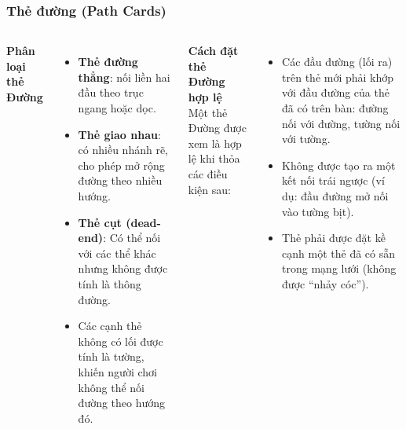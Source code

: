 \begin{frame}
\frametitle{Thẻ đường (Path Cards)}

\begin{columns}
    \textbf{Phân loại thẻ Đường}  \\
    \begin{itemize}
        \item \textbf{Thẻ đường thẳng}: nối liền hai đầu theo trục ngang hoặc dọc.
        \item \textbf{Thẻ giao nhau}: có nhiều nhánh rẽ, cho phép mở rộng đường theo nhiều hướng.
        \item \textbf{Thẻ cụt (dead-end)}: Có thể nối với các thể khác nhưng không được tính là thông đường.
        \item Các cạnh thẻ không có lối được tính là tường,  khiến người chơi không thể nối đường theo hướng đó.
    \end{itemize}
    

    \textbf{Cách đặt thẻ Đường hợp lệ}  \\
    Một thẻ Đường được xem là hợp lệ khi thỏa các điều kiện sau:
    \begin{itemize}
        \item Các đầu đường (lối ra) trên thẻ mới phải khớp với đầu đường của thẻ đã có trên bàn: đường nối với đường, tường nối với tường.
        \item Không được tạo ra một kết nối trái ngược (ví dụ: đầu đường mở nối vào tường bịt).
        \item Thẻ phải được đặt kề cạnh một thẻ đã có sẵn trong mạng lưới (không được “nhảy cóc”).
    \end{itemize}

\end{columns}
\end{frame}

